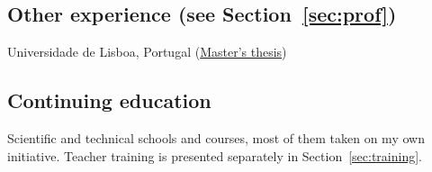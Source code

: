 \documentclass[11pt]{article}
\begin{document}
\subsection[Other experience]{Other experience {\normalsize\mdseries(see Section~\ref{sec:prof})}}
\begin{entries}
    {Universidade de Lisboa, Portugal
    (\href{http://hdl.handle.net/10362/149236}{Master's thesis})}
\end{entries}

\subsection{Continuing education}\label{sec:continuing}
Scientific and technical schools and courses, most of them taken on my own initiative.
Teacher training is presented separately in Section~\ref{sec:training}.
\end{document}
